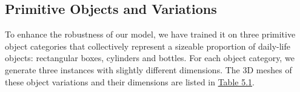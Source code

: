 \documentclass[11pt, a4paper]{report}
\begin{document}
\subsection{Primitive Objects and Variations}\label{sec:5.2.2}
To enhance the robustness of our model, we have trained it on three primitive object categories that collectively represent a sizeable proportion of daily-life objects: rectangular boxes, cylinders and bottles. For each object category, we generate three instances with slightly different dimensions. The 3D meshes of these object variations and their dimensions are listed in \hyperref[tbl:5.1]{Table 5.1}.

\begin{table}[H]
    \centering
\end{table}
\end{document}
